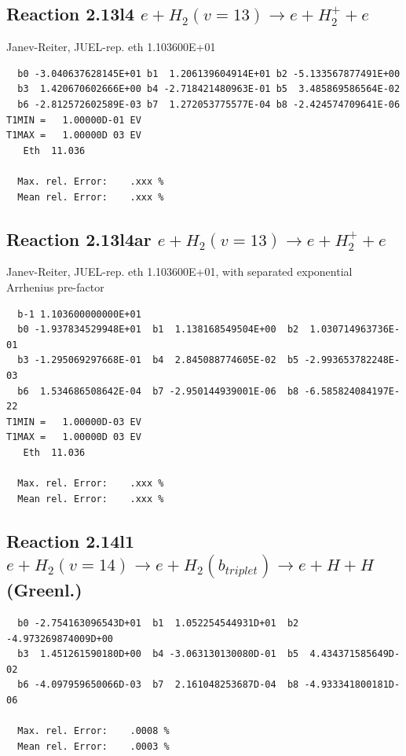 \documentclass[12pt,dvipdfmx]{article}
\begin{document}
\subsection{
Reaction 2.13l4
 $ e + H_2(v=13) \rightarrow e + H_2^+  + e$
}
Janev-Reiter, JUEL-rep. eth 1.103600E+01

\begin{small}\begin{verbatim}
  b0 -3.040637628145E+01 b1  1.206139604914E+01 b2 -5.133567877491E+00
  b3  1.420670602666E+00 b4 -2.718421480963E-01 b5  3.485869586564E-02
  b6 -2.812572602589E-03 b7  1.272053775577E-04 b8 -2.424574709641E-06
T1MIN =   1.00000D-01 EV
T1MAX =   1.00000D 03 EV
   Eth  11.036

  Max. rel. Error:    .xxx %
  Mean rel. Error:    .xxx %
\end{verbatim}\end{small}

\subsection{
Reaction 2.13l4ar
 $ e + H_2(v=13) \rightarrow e + H_2^+  + e$
}
Janev-Reiter, JUEL-rep. eth 1.103600E+01,
with separated exponential Arrhenius pre-factor

\begin{small}\begin{verbatim}
  b-1 1.103600000000E+01
  b0 -1.937834529948E+01  b1  1.138168549504E+00  b2  1.030714963736E-01
  b3 -1.295069297668E-01  b4  2.845088774605E-02  b5 -2.993653782248E-03
  b6  1.534686508642E-04  b7 -2.950144939001E-06  b8 -6.585824084197E-22
T1MIN =   1.00000D-03 EV
T1MAX =   1.00000D 03 EV
   Eth  11.036

  Max. rel. Error:    .xxx %
  Mean rel. Error:    .xxx %
\end{verbatim}\end{small}

\newpage
\subsection{
Reaction 2.14l1
$ e + H_2(v=14) \rightarrow e + H_2(b_{triplet}) \rightarrow e + H + H $ (Greenl.)
}


\begin{small}\begin{verbatim}
  b0 -2.754163096543D+01  b1  1.052254544931D+01  b2 -4.973269874009D+00
  b3  1.451261590180D+00  b4 -3.063130130080D-01  b5  4.434371585649D-02
  b6 -4.097959650066D-03  b7  2.161048253687D-04  b8 -4.933341800181D-06

  Max. rel. Error:    .0008 %
  Mean rel. Error:    .0003 %
\end{verbatim}\end{small}
\end{document}
